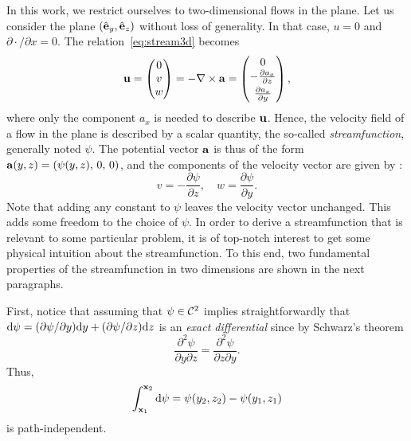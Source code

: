 In this work, we restrict ourselves to two-dimensional flows in the plane. Let us consider the plane $(\ey,\ez)$ without loss of generality. In that case, $u = 0$ and $\partial \cdot/\partial x = 0$. The relation~\eqref{eq:stream3d} becomes 
\begin{equation}
	\b u = \begin{pmatrix} 0 \\ v \\ w \end{pmatrix} = - \nabla \times \b a = \begin{pmatrix} 0\\ - \frac{\partial a_x}{\partial z}\\[.1 cm] \frac{\partial a_x}{\partial y} \end{pmatrix},
\end{equation}
where only the component $a_x$ is needed to describe $\b u$. Hence, the velocity field of a flow in the plane is described by a scalar quantity, the so-called \textit{streamfunction}, generally noted $\psi$. The potential vector $\b a$ is thus of the form $\b a(y,z) = (\psi(y,z),\, 0,\, 0)$, and the components of the velocity vector are given by :
\begin{equation} \label{eq:u-psi}
	v = -\frac{\partial \psi}{\partial z}, \quad w = \frac{\partial \psi}{\partial y}.
\end{equation}
Note that adding any constant to $\psi$ leaves the velocity vector unchanged. This adds some freedom to the choice of $\psi$. In order to derive a streamfunction that is relevant to some particular problem, it is of top-notch interest to get some physical intuition about the streamfunction. To this end, two fundamental properties of the streamfunction in two dimensions are shown in the next paragraphs. 

First, notice that assuming that $\psi \in \C^2$ implies straightforwardly that $\rm d\psi = (\partial \psi/\partial y)\rm dy + (\partial \psi/\partial z) \rm dz$ is an \textit{exact differential} since by Schwarz's theorem
\begin{equation}
	\frac{\partial^2 \psi}{\partial y \partial z} = \frac{\partial^2 \psi}{\partial z \partial y}.
\end{equation}
Thus,
\begin{equation}
\int_{\b x_1}^{\b x_2} \rm d\psi = \psi(y_2,z_2) - \psi(y_1,z_1)	
\end{equation}
is path-independent.

